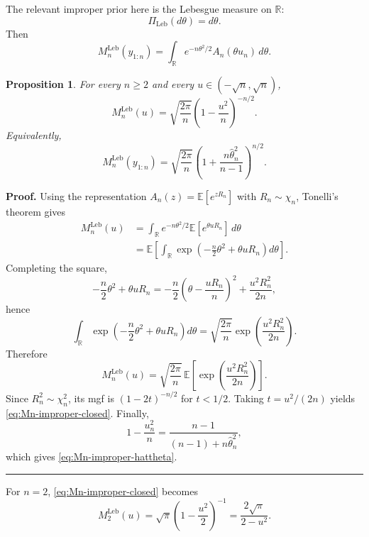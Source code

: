 \documentclass{article}%
\newtheorem{proposition}[theorem]{Proposition}
\newenvironment{proof}[1][Proof]{\noindent\textbf{#1.} }{\ \rule{0.5em}{0.5em}}
\newcommand{\E}{\mathbb{E}}
\begin{document}
The relevant improper prior here is the Lebesgue measure on $\mathbb R$:
\[
\Pi_{\mathrm{Leb}}(d\theta)=d\theta.
\]
Then
\[
M_n^{\mathrm{Leb}}(y_{1:n})
=
\int_{\mathbb R} e^{-n\theta^2/2}A_n(\theta u_n)\,d\theta.
\]

\begin{proposition}\label{prop:improper-Mn}
For every $n\ge 2$ and every $u\in(-\sqrt n,\sqrt n)$,
\begin{equation}\label{eq:Mn-improper-closed}
M_n^{\mathrm{Leb}}(u)
=
\sqrt{\frac{2\pi}{n}}
\left(1-\frac{u^2}{n}\right)^{-n/2}.
\end{equation}
Equivalently,
\begin{equation}\label{eq:Mn-improper-hattheta}
M_n^{\mathrm{Leb}}(y_{1:n})
=
\sqrt{\frac{2\pi}{n}}
\left(1+\frac{n\hat\theta_n^2}{n-1}\right)^{n/2}.
\end{equation}
\end{proposition}

\begin{proof}
Using the representation $A_n(z)=\E[e^{zR_n}]$ with $R_n\sim\chi_n$, Tonelli's theorem gives
\begin{align*}
M_n^{\mathrm{Leb}}(u)
&=
\int_{\mathbb R} e^{-n\theta^2/2}\E[e^{\theta u R_n}]\,d\theta\\
&=
\E\!\left[\int_{\mathbb R}\exp\!\left(-\frac n2\theta^2+\theta uR_n\right)d\theta\right].
\end{align*}
Completing the square,
\[
-\frac n2\theta^2+\theta uR_n
=
-\frac n2\left(\theta-\frac{uR_n}{n}\right)^2+\frac{u^2R_n^2}{2n},
\]
hence
\[
\int_{\mathbb R}\exp\!\left(-\frac n2\theta^2+\theta uR_n\right)d\theta
=
\sqrt{\frac{2\pi}{n}}\exp\!\left(\frac{u^2R_n^2}{2n}\right).
\]
Therefore
\[
M_n^{\mathrm{Leb}}(u)
=
\sqrt{\frac{2\pi}{n}}\,
\E\!\left[\exp\!\left(\frac{u^2R_n^2}{2n}\right)\right].
\]
Since $R_n^2\sim\chi_n^2$, its mgf is $(1-2t)^{-n/2}$ for $t<1/2$. Taking
$t=u^2/(2n)$ yields \eqref{eq:Mn-improper-closed}. Finally,
\[
1-\frac{u_n^2}{n}
=
\frac{n-1}{(n-1)+n\hat\theta_n^2},
\]
which gives \eqref{eq:Mn-improper-hattheta}.
\end{proof}

For $n=2$, \eqref{eq:Mn-improper-closed} becomes
\begin{equation}\label{eq:M2-improper}
M_2^{\mathrm{Leb}}(u)
=
\sqrt{\pi}\left(1-\frac{u^2}{2}\right)^{-1}
=
\frac{2\sqrt{\pi}}{2-u^2}.
\end{equation}
\end{document}

